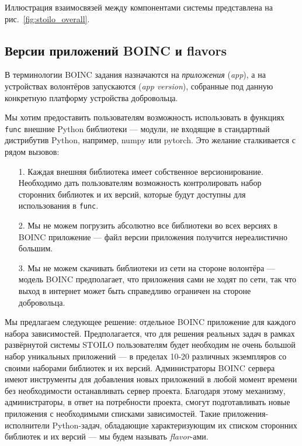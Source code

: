 \documentclass[a4paper,12pt]{extarticle}
\begin{document}
Иллюстрация взаимосвязей между компонентами системы представлена на рис.~\ref{fig:stoilo_overall}.

\subsection{Версии приложений BOINC и flavors}\label{sec:flavor}

В терминологии BOINC задания назначаются на \textit{приложения} (\textit{app}), а на устройствах волонтёров запускаются  (\textit{app version}), собранные под данную конкретную платформу устройства добровольца.

Мы хотим предоставить пользователям возможность использовать в функциях \texttt{func} внешние Python библиотеки — модули, не входящие в стандартный дистрибутив Python, например, numpy или pytorch. Это желание сталкивается с рядом вызовов:
\begin{enumerate}
    \item[1.] Каждая внешняя библиотека имеет собственное версионирование. Необходимо дать пользователям возможность контролировать набор сторонних библиотек и их версий, которые будут доступны для использования в \texttt{func}.
    \item[2.] Мы не можем погрузить абсолютно все библиотеки во всех версиях в BOINC приложение — файл версии приложения получится нереалистично большим.
    \item[3.] Мы не можем скачивать библиотеки из сети на стороне волонтёра — модель BOINC предполагает, что приложения сами не ходят по сети, так что выход в интернет может быть справедливо ограничен на стороне добровольца.
\end{enumerate}

Мы предлагаем следующее решение: отдельное BOINC приложение для каждого набора зависимостей. Предполагается, что для решения реальных задач в рамках развёрнутой системы STOILO пользователям будет необходим не очень большой набор уникальных приложений — в пределах 10-20 различных экземпляров со своими наборами библиотек и их версий. Администраторы BOINC сервера имеют инструменты для добавления новых приложений в любой момент времени без необходимости останавливать сервер проекта. Благодаря этому механизму, администраторы, в ответ на потребности проекта, смогут подготавливать новые приложения с необходимыми списками зависимостей. Такие приложения-исполнители Python-задач, обладающие характеризующим их списком сторонних библиотек и их версий — мы будем называть \textit{flavor}-ами.
\end{document}
